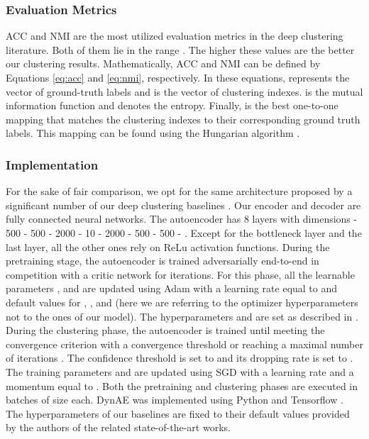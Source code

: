 \documentclass{article}
\begin{document}
\subsubsection{Evaluation Metrics}
ACC \cite{paper41} and NMI \cite{paper42} are the most utilized evaluation metrics in the deep clustering literature. Both of them lie in the range . The higher these values are the better our clustering results. Mathematically, ACC and NMI can be defined by Equations \ref{eq:acc} and \ref{eq:nmi}, respectively. In these equations,  represents the vector of ground-truth labels and  is the vector of clustering indexes.  is the mutual information function and  denotes the entropy. Finally,  is the best one-to-one mapping that matches the clustering indexes to their corresponding ground truth labels. This mapping can be found using the Hungarian algorithm \cite{paper43}.





\subsubsection{Implementation}
For the sake of fair comparison, we opt for the same architecture proposed by a significant number of our deep clustering baselines \cite{paper27, paper28, paper35, paper29}. Our encoder and decoder are fully connected neural networks. The autoencoder has 8 layers with dimensions  - 500 - 500 - 2000 - 10 - 2000 - 500 - 500 - . Except for the bottleneck layer and the last layer, all the other ones rely on ReLu \cite{paper44} activation functions. During the pretraining stage, the autoencoder is trained adversarially end-to-end in competition with a critic network for  iterations. For this phase, all the learnable parameters ,  and  are updated using Adam \cite{paper45} with a learning rate equal to  and default values for , , and  (here we are referring to the optimizer hyperparameters not to the ones of our model). The hyperparameters  and  are set as described in \cite{paper5}. During the clustering phase, the autoencoder is trained until meeting the convergence criterion with a convergence threshold  or reaching a maximal number of iterations . The confidence threshold is set to  and its dropping rate is set to . The training parameters  and  are updated using SGD with a learning rate  and a momentum equal to . Both the pretraining and clustering phases are executed in batches of size  each. DynAE was implemented using Python and Tensorflow \cite{paper46}. The hyperparameters of our baselines are fixed to their default values provided by the authors of the related state-of-the-art works.
\end{document}
